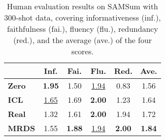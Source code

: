 
\begin{table}[th]
\caption{Human evaluation results on SAMSum with 300-shot data, covering informativeness (inf.), faithfulness (fai.), fluency (flu.), redundancy (red.), and the average (ave.) of the four scores.}
\label{tab:sub}
\centering
\begin{tabular}{lcccc|c}
\toprule
     & \textbf{Inf.} & \textbf{Fai.} & \textbf{Flu.} & \textbf{Red.} & \textbf{Ave.} \\
\midrule
\textbf{Zero}          & \textbf{1.95} & 1.50 & \underline{1.94} & 0.83 & 1.56 \\
\textbf{ICL}           & \underline{1.65} & 1.69 & \textbf{2.00} & 1.23 & 1.64 \\
\textbf{Real}          & 1.32 & 1.61 & \textbf{2.00} & 1.94 & 1.72 \\
\textbf{MRDS}           & 1.55 & \textbf{1.88} & \underline{1.94} & \textbf{2.00} & \textbf{1.84} \\
\bottomrule
\end{tabular}
\end{table}


